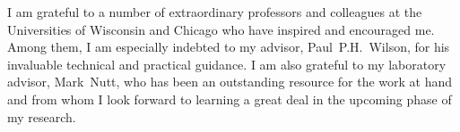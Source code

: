 I am grateful to a number of extraordinary professors and colleagues at the 
Universities of Wisconsin and Chicago who have inspired and encouraged me. Among  
them, I am especially indebted to my advisor, Paul~P.H.~Wilson, for his invaluable 
technical and practical guidance. I am also grateful to my laboratory advisor, 
Mark~Nutt, who has been an outstanding resource for the work at hand and from whom 
I look forward to learning a great deal in the upcoming phase of my research.
